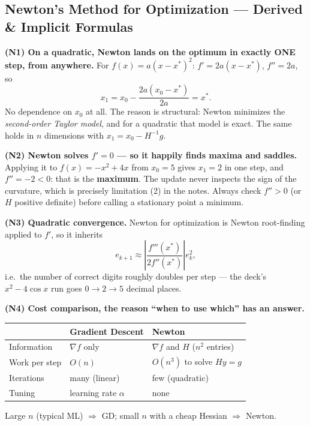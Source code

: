 \subsection{Newton's Method for Optimization --- Derived \& Implicit Formulas}

\begin{derivedbox}
\textbf{(N1) On a quadratic, Newton lands on the optimum in exactly ONE step, from anywhere.}
For $f(x) = a(x-x^\ast)^2$: $f' = 2a(x-x^\ast)$, $f'' = 2a$, so
\[
x_{1} = x_0 - \frac{2a(x_0-x^\ast)}{2a} = x^\ast .
\]
No dependence on $x_0$ at all. The reason is structural: Newton minimizes the \emph{second-order Taylor model}, and for a quadratic that model is exact. The same holds in $n$ dimensions with $x_1 = x_0 - H^{-1}g$.

\smallskip
\textbf{(N2) Newton solves $f'=0$ --- so it happily finds maxima and saddles.}
Applying it to $f(x) = -x^2+4x$ from $x_0 = 5$ gives $x_1 = 2$ in one step, and $f''=-2<0$: that is the \textbf{maximum}. The update never inspects the sign of the curvature, which is precisely limitation (2) in the notes. Always check $f''>0$ (or $H$ positive definite) before calling a stationary point a minimum.

\smallskip
\textbf{(N3) Quadratic convergence.} Newton for optimization is Newton root-finding applied to $f'$, so it inherits
\[
e_{k+1} \approx \left|\frac{f'''(x^\ast)}{2f''(x^\ast)}\right| e_k^2,
\]
i.e.\ the number of correct digits roughly doubles per step --- the deck's $x^2-4\cos x$ run goes $0 \to 2 \to 5$ decimal places.

\smallskip
\textbf{(N4) Cost comparison, the reason ``when to use which'' has an answer.}
\begin{center}\small
\begin{tabular}{@{}lll@{}}
\toprule
& Gradient Descent & Newton\\
\midrule
Information & $\nabla f$ only & $\nabla f$ and $H$ ($n^2$ entries)\\
Work per step & $O(n)$ & $O(n^3)$ to solve $Hy=g$\\
Iterations & many (linear) & few (quadratic)\\
Tuning & learning rate $\alpha$ & none\\
\bottomrule
\end{tabular}
\end{center}
Large $n$ (typical ML) $\Rightarrow$ GD; small $n$ with a cheap Hessian $\Rightarrow$ Newton.
\end{derivedbox}

